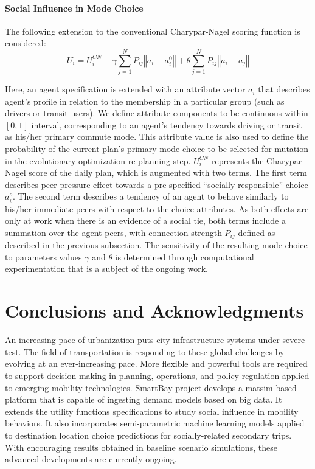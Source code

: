 \paragraph{Social Influence in Mode Choice} 
The following extension to the conventional Charypar-Nagel scoring function is considered:
\begin{equation*}
U_i=U_i^{CN}-\gamma\sum_{j=1}^N P_{ij}\left\Vert a_i - a_i^0 \right\Vert +\theta \sum_{j=1}^N P_{ij} \left\Vert a_i - a_j \right\Vert
\end{equation*}

Here, an agent specification is extended with an attribute vector $a_i$ that describes agent's profile in relation to the membership in a particular group (such as drivers or transit users). We define attribute components to be continuous within $\left[0, 1\right]$ interval, corresponding to an agent's tendency towards driving or transit as his/her primary commute mode. This attribute value is also used to define the probability of the current plan's primary mode choice to be selected for mutation in the evolutionary optimization re-planning step. $U_i^{CN}$ represents the Charypar-Nagel score of the daily plan, which is augmented with two terms. The first term describes peer pressure effect towards a pre-specified ``socially-responsible'' choice $a_i^o$. The second term describes a tendency of an agent to behave similarly to his/her immediate peers with respect to the choice attributes. As both effects are only at work when there is an evidence of a social tie, both terms include a summation over the agent peers, with connection strength $P_{ij}$ defined as described in the previous subsection. The sensitivity of the resulting mode choice to parameters values $\gamma$ and $\theta$ is determined through computational experimentation that is a subject of the ongoing work.

\section{Conclusions and Acknowledgments}
An increasing pace of urbanization puts city infrastructure systems under severe test. The field of transportation is responding to these global challenges by evolving at an ever-increasing pace. More flexible and powerful tools are required to support decision making in planning, operations, and policy regulation applied to emerging mobility technologies. SmartBay project develops a \gls{matsim}-based platform that is capable of ingesting demand models based on big data. It extends the utility functions specifications to study social influence in mobility behaviors. It also incorporates semi-parametric machine learning models applied to destination location choice predictions for socially-related secondary trips. With encouraging results obtained in baseline scenario simulations, these advanced developments are currently ongoing. 

